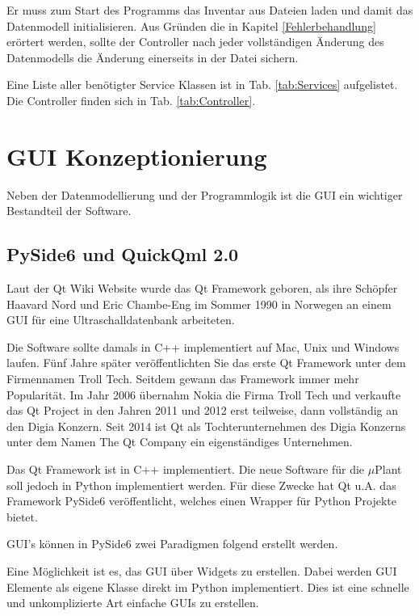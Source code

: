 Er muss zum Start des Programms das Inventar aus Dateien laden und damit das Datenmodell initialisieren.
Aus Gründen die in Kapitel \ref{Fehlerbehandlung} erörtert werden, sollte der Controller nach jeder vollständigen Änderung
des Datenmodells die Änderung einerseits in der Datei sichern.

Eine Liste aller benötigter Service Klassen ist in Tab. \ref{tab:Services} aufgelistet.
Die Controller finden sich in Tab. \ref{tab:Controller}.





\section{GUI Konzeptionierung}

Neben der Datenmodellierung und der Programmlogik ist die GUI ein wichtiger Bestandteil der Software.

\subsection{PySide6 und QuickQml 2.0}

Laut der Qt Wiki Website \cite{QtWikiHistory} wurde das Qt Framework geboren, als ihre Schöpfer Haavard Nord und
Eric Chambe-Eng im Sommer 1990 in Norwegen an einem GUI für eine Ultraschalldatenbank arbeiteten.

Die Software sollte damals in C++ implementiert auf Mac, Unix und Windows laufen.
Fünf Jahre später veröffentlichten Sie das erste Qt Framework unter dem Firmennamen Troll Tech.
Seitdem gewann das Framework immer mehr Popularität.
Im Jahr 2006 übernahm Nokia die Firma Troll Tech und verkaufte das Qt Project in den Jahren 2011 und 2012 erst teilweise,
dann vollständig an den Digia Konzern.
Seit 2014 ist Qt als Tochterunternehmen des Digia Konzerns unter dem Namen \glqq The Qt Company\grqq{} ein eigenständiges Unternehmen.

Das Qt Framework ist in C++ implementiert.
Die neue Software für die $\mu$Plant soll jedoch in Python implementiert werden.
Für diese Zwecke hat Qt u.A. das Framework PySide6 veröffentlicht, welches einen Wrapper für Python Projekte bietet.

GUI's können in PySide6 zwei Paradigmen folgend erstellt werden.

Eine Möglichkeit ist es, das GUI über Widgets\cite{pysideQtWidgets} zu erstellen.
Dabei werden GUI Elemente als eigene Klasse direkt im Python implementiert.
Dies ist eine schnelle und unkomplizierte Art einfache GUIs zu erstellen. 

